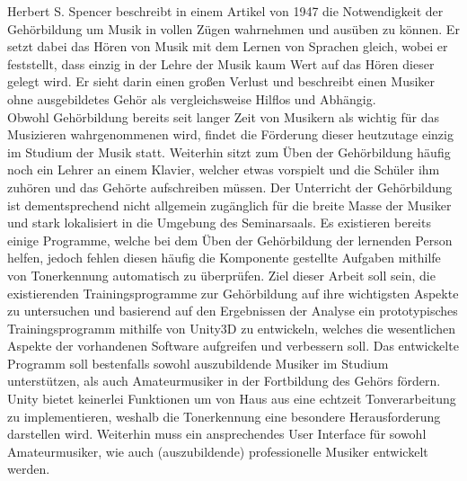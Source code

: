 Herbert S. Spencer beschreibt in einem Artikel von 1947 die Notwendigkeit der Gehörbildung um Musik in vollen Zügen wahrnehmen und ausüben zu können. Er setzt dabei das Hören von Musik mit dem Lernen von Sprachen gleich, wobei er feststellt, dass einzig in der Lehre der Musik kaum Wert auf das Hören dieser gelegt wird. Er sieht darin einen großen Verlust und beschreibt einen Musiker ohne ausgebildetes Gehör als vergleichsweise Hilflos und Abhängig. \\
Obwohl Gehörbildung bereits seit langer Zeit von Musikern als wichtig für das Musizieren wahrgenommenen wird, findet die Förderung dieser heutzutage einzig im Studium der Musik statt. Weiterhin sitzt zum Üben der Gehörbildung häufig noch ein Lehrer an einem Klavier, welcher etwas vorspielt und die Schüler ihm zuhören und das Gehörte aufschreiben müssen. Der Unterricht der Gehörbildung ist dementsprechend nicht allgemein zugänglich für die breite Masse der Musiker und stark lokalisiert in die Umgebung des Seminarsaals. Es existieren bereits einige Programme, welche bei dem Üben der Gehörbildung der lernenden Person helfen, jedoch fehlen diesen häufig die Komponente gestellte Aufgaben mithilfe von Tonerkennung automatisch zu überprüfen.
Ziel dieser Arbeit soll sein, die existierenden Trainingsprogramme zur Gehörbildung auf ihre wichtigsten Aspekte zu untersuchen und basierend auf den Ergebnissen der Analyse ein prototypisches Trainingsprogramm mithilfe von Unity3D zu entwickeln, welches die wesentlichen Aspekte der vorhandenen Software aufgreifen und verbessern soll. Das entwickelte Programm soll bestenfalls sowohl auszubildende Musiker im Studium unterstützen, als auch Amateurmusiker in der Fortbildung des Gehörs fördern. Unity bietet keinerlei Funktionen um von Haus aus eine echtzeit Tonverarbeitung zu implementieren, weshalb die Tonerkennung eine besondere Herausforderung darstellen wird. Weiterhin muss ein ansprechendes User Interface für sowohl Amateurmusiker, wie auch (auszubildende) professionelle Musiker entwickelt werden. 

